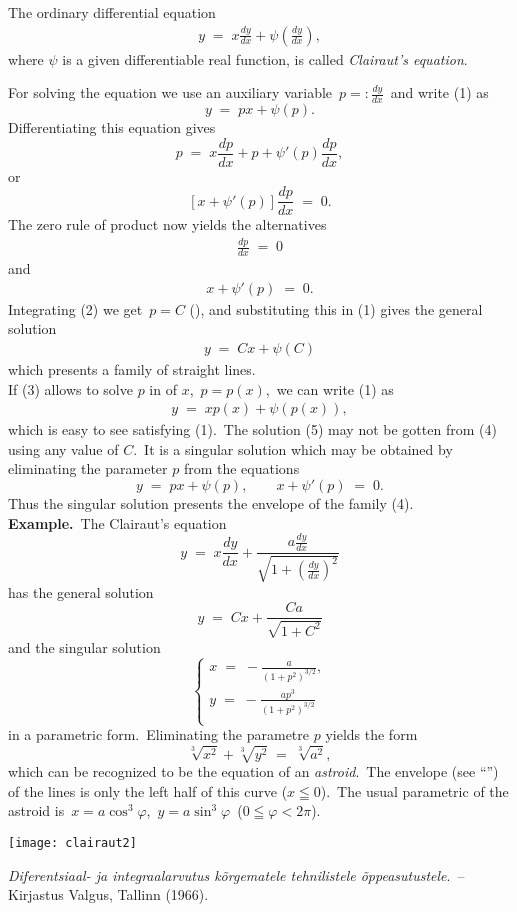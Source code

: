 \documentclass[12pt]{article}
\theoremstyle{definition}
\begin{document}
The ordinary differential equation
\begin{align}
y \;=\; x\frac{dy}{dx}+\psi\left(\frac{dy}{dx}\right),
\end{align}
where $\psi$ is a given differentiable real function, is called {\em Clairaut's equation}.

For solving the equation we use an auxiliary variable\, $p =: \frac{dy}{dx}$\, and write (1) as
$$y \;=\; px+\psi(p).$$
Differentiating this equation gives
$$p  \;=\; x\frac{dp}{dx}+p+\psi'(p)\frac{dp}{dx},$$
or
$$[x+\psi'(p)]\frac{dp}{dx} \;=\; 0.$$
The zero rule of product now yields the alternatives
\begin{align}
      \frac{dp}{dx} \;=\; 0
\end{align}
and
\begin{align}
        x+\psi'(p) \;=\; 0.
\end{align}
Integrating (2) we get\, $p = C$ (), and substituting this in (1) gives the general solution
\begin{align}
      y \;=\; Cx+\psi(C)
\end{align}
which presents a family of straight lines.\\

If (3) allows to solve $p$ in  of $x$,\, $p = p(x)$,\, we can write (1) as
\begin{align}
      y \;=\; xp(x)+\psi(p(x)),
\end{align}
which is easy to see satisfying (1).\, The solution (5) may not be gotten from (4) using any value of $C$.\, It is a singular solution which may be obtained by eliminating the parameter $p$ from the equations
   $$y \;=\; px+\psi(p), \qquad x+\psi'(p) \;=\; 0.$$
Thus the singular solution presents the envelope of the family (4).\\

\textbf{Example.}\, The Clairaut's equation
  $$y \;=\; x\frac{dy}{dx}+\frac{a\frac{dy}{dx}}{\sqrt{1+(\frac{dy}{dx})^2}}$$
has the general solution
     $$y \;=\; Cx+\frac{Ca}{\sqrt{1\!+\!C^2}}$$
and the singular solution
$$\begin{cases}
                x \;=\; -\frac{a}{(1\!+\!p^2)^{3/2}},\\
                y \;=\; -\frac{ap^3}{(1+p^2)^{3/2}}\\
\end{cases}$$
in a parametric form.\, Eliminating the parametre $p$ yields the form
   $$\sqrt[3]{x^2}+\sqrt[3]{y^2} \;=\; \sqrt[3]{a^2},$$
which can be recognized to be the equation of an {\em astroid}.\, The envelope (see ``'') of the lines is only the left half of this curve ($x \leqq 0$).\, The usual parametric  of the astroid is\, $x = a\cos^3\varphi$,\, $y = a\sin^3\varphi$\, 
($0 \leqq \varphi < 2\pi$).

\begin{center}
\texttt{[image: clairaut2]}
\end{center}

\begin{thebibliography}{9}
 {\em Diferentsiaal- ja integraalarvutus k\~{o}rgematele tehnilistele \~{o}ppeasutustele}.\, -- Kirjastus Valgus, Tallinn  (1966).
\end{thebibliography}

\end{document}
